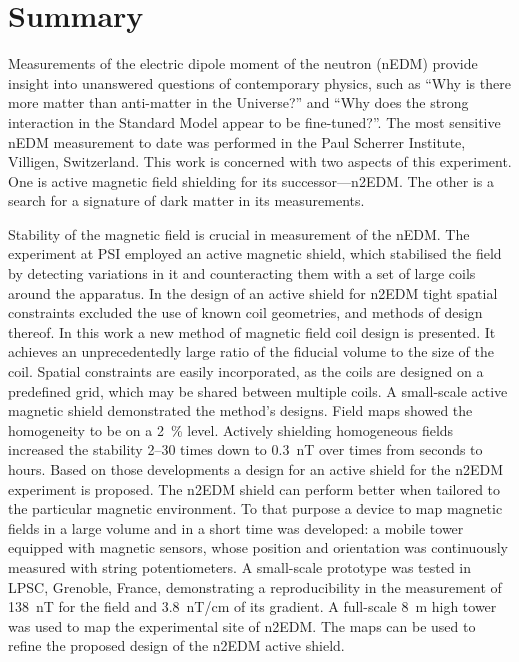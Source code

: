 

\begingroup
\let\clearpage\relax
\let\cleardoublepage\relax
\let\cleardoublepage\relax

\chapter*{Summary} %
Measurements of the electric dipole moment of the neutron (nEDM) provide insight into unanswered questions of contemporary physics, such as ``Why is there more matter than anti-matter in the Universe?'' and ``Why does the strong interaction in the Standard Model appear to be fine-tuned?''. The most sensitive nEDM measurement to date was performed in the Paul Scherrer Institute, Villigen, Switzerland. This work is concerned with two aspects of this experiment. One is active magnetic field shielding for its successor---n2EDM\@. The other is a search for a signature of dark matter in its measurements.

Stability of the magnetic field is crucial in measurement of the nEDM\@. The experiment at PSI employed an active magnetic shield, which stabilised the field by detecting  variations in it and counteracting them with a set of large coils around the apparatus.
In the design of an active shield for n2EDM tight spatial constraints excluded the use of known coil geometries, and methods of design thereof.
In this work a new method of magnetic field coil design is presented. It achieves an unprecedentedly large ratio of the fiducial volume to the size of the coil.
Spatial constraints are easily incorporated, as the coils are designed on a predefined grid, which may be shared between multiple coils.
A small-scale active magnetic shield demonstrated the method's designs. Field maps showed the homogeneity to be on a \SI{2}{\percent} level.
Actively shielding homogeneous fields increased the stability 2--30 times down to \SI{0.3}{nT} over times from seconds to hours.
Based on those developments a design for an active shield for the n2EDM experiment is proposed.
The n2EDM shield can perform better when tailored to the particular magnetic environment. To that purpose a device to map magnetic fields in a large volume and in a short time was developed: a mobile tower equipped with magnetic sensors, whose position and orientation was continuously measured with string potentiometers. A small-scale prototype was tested in LPSC, Grenoble, France, demonstrating a reproducibility in the measurement of \SI{138}{nT} for the field and \SI{3.8}{nT/cm} of its gradient. A full-scale \SI{8}{m} high tower was used to map the experimental site of n2EDM\@. The maps can be used to refine the proposed design of the n2EDM active shield.

